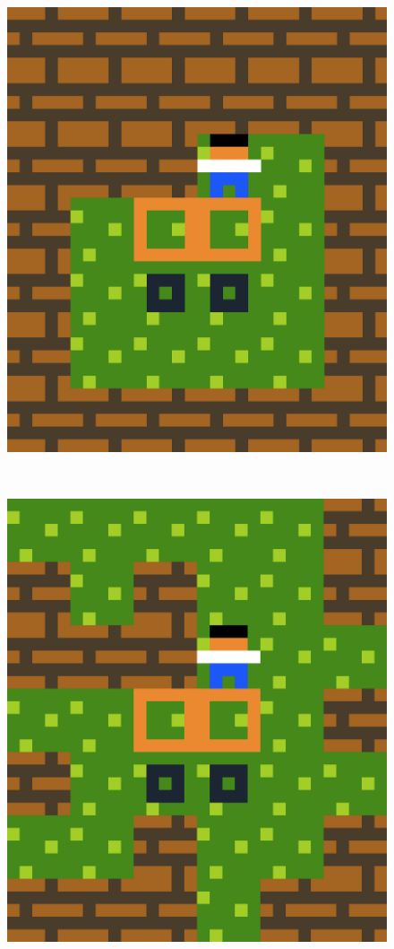 \begin{figure}[!htbp]
\begin{minipage}[t]{0.2\textwidth}
\end{minipage}
$\:$
\begin{minipage}[t]{0.2\textwidth}
\includegraphics[width=\textwidth]{figures/finaldesign6_1.png} \hfill \\
\end{minipage}
$\:$
\begin{minipage}[t]{0.2\textwidth}
\includegraphics[width=\textwidth]{figures/finaldesign6_2.png} \hfill \\

\end{minipage}
\end{figure}
